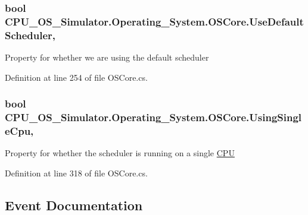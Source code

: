 \subsubsection[{Use\+Default\+Scheduler}]{\setlength{\rightskip}{0pt plus 5cm}bool C\+P\+U\+\_\+\+O\+S\+\_\+\+Simulator.\+Operating\+\_\+\+System.\+O\+S\+Core.\+Use\+Default\+Scheduler\hspace{0.3cm}{\ttfamily [get]}, {\ttfamily [set]}}\label{class_c_p_u___o_s___simulator_1_1_operating___system_1_1_o_s_core_a1fd8b54b31fa415f09f2b9bc407802dd}


Property for whether we are using the default scheduler 



Definition at line 254 of file O\+S\+Core.\+cs.

\hypertarget{class_c_p_u___o_s___simulator_1_1_operating___system_1_1_o_s_core_ac965e1317dc5c6b6ae93c410098dd913}{}
\subsubsection[{Using\+Single\+Cpu}]{\setlength{\rightskip}{0pt plus 5cm}bool C\+P\+U\+\_\+\+O\+S\+\_\+\+Simulator.\+Operating\+\_\+\+System.\+O\+S\+Core.\+Using\+Single\+Cpu\hspace{0.3cm}{\ttfamily [get]}, {\ttfamily [set]}}\label{class_c_p_u___o_s___simulator_1_1_operating___system_1_1_o_s_core_ac965e1317dc5c6b6ae93c410098dd913}


Property for whether the scheduler is running on a single \hyperlink{namespace_c_p_u___o_s___simulator_1_1_c_p_u}{C\+P\+U} 



Definition at line 318 of file O\+S\+Core.\+cs.



\subsection{Event Documentation}
\hypertarget{class_c_p_u___o_s___simulator_1_1_operating___system_1_1_o_s_core_abcbb2efff8a4078fae3edb9b31f62198}{}
